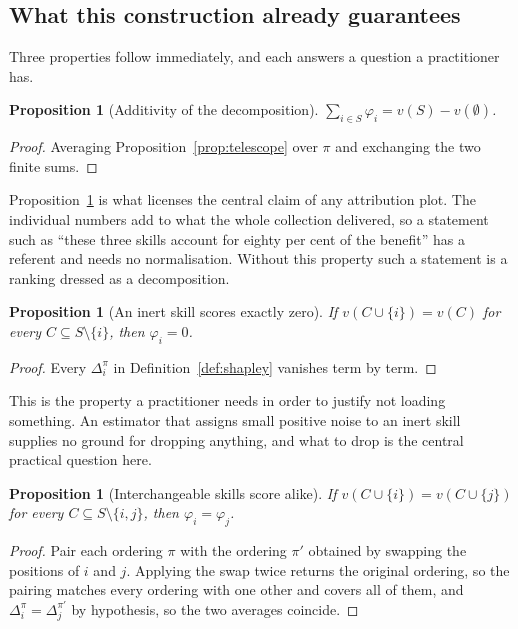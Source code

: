 \documentclass[11pt]{article}
\theoremstyle{plain}
\newtheorem{proposition}[theorem]{Proposition}
\theoremstyle{definition}
\theoremstyle{remark}
\newcommand{\lift}{v(S) - v(\emptyset)}
\begin{document}
\subsection{What this construction already guarantees}

Three properties follow immediately, and each answers a question a practitioner has.

\begin{proposition}[Additivity of the decomposition]\label{prop:eff}
$\sum_{i \in S} \varphi_i = \lift$.
\end{proposition}

\begin{proof}
Averaging Proposition~\ref{prop:telescope} over $\pi$ and exchanging the two finite sums.
\end{proof}

Proposition~\ref{prop:eff} is what licenses the central claim of any attribution plot. The individual numbers add to what the whole collection delivered, so a statement such as ``these three skills account for eighty per cent of the benefit'' has a referent and needs no normalisation. Without this property such a statement is a ranking dressed as a decomposition.

\begin{proposition}[An inert skill scores exactly zero]\label{prop:null}
If $v(C \cup \{i\}) = v(C)$ for every $C \subseteq S\setminus\{i\}$, then $\varphi_i = 0$.
\end{proposition}

\begin{proof}
Every $\Delta_i^\pi$ in Definition~\ref{def:shapley} vanishes term by term.
\end{proof}

This is the property a practitioner needs in order to justify not loading something. An estimator that assigns small positive noise to an inert skill supplies no ground for dropping anything, and what to drop is the central practical question here.

\begin{proposition}[Interchangeable skills score alike]\label{prop:sym}
If $v(C \cup \{i\}) = v(C \cup \{j\})$ for every $C \subseteq S \setminus \{i,j\}$, then $\varphi_i = \varphi_j$.
\end{proposition}

\begin{proof}
Pair each ordering $\pi$ with the ordering $\pi'$ obtained by swapping the positions of $i$ and $j$. Applying the swap twice returns the original ordering, so the pairing matches every ordering with one other and covers all of them, and $\Delta_i^\pi = \Delta_j^{\pi'}$ by hypothesis, so the two averages coincide.
\end{proof}
\end{document}
